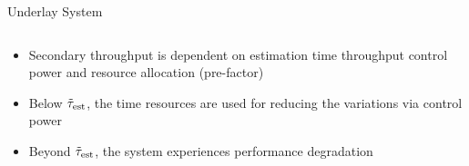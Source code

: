 \documentclass[16pt]{beamer}
\begin{document}
\begin{frame}[t]{Underlay System}
\begin{columns}
\begin{column}{0.55\columnwidth}
\begin{center}
{{	
			}
			\fi
                }
		\end{center}
		\end{column}
	\end{columns}
	\iftrue
	{	
		\begin{block}{}%
		\begin{itemize}
			\item Secondary throughput is dependent on estimation time throughput control power and resource allocation (pre-factor)   
			\item Below $\tilde{\tau}_{\text{est}}$, the time resources are used for reducing the variations via control power		
			\item Beyond $\tilde{\tau}_{\text{est}}$, the system experiences performance degradation
			
		\end{itemize}	
		\end{block}	
	}
	\fi	

\end{frame}
\fi
\end{document}
